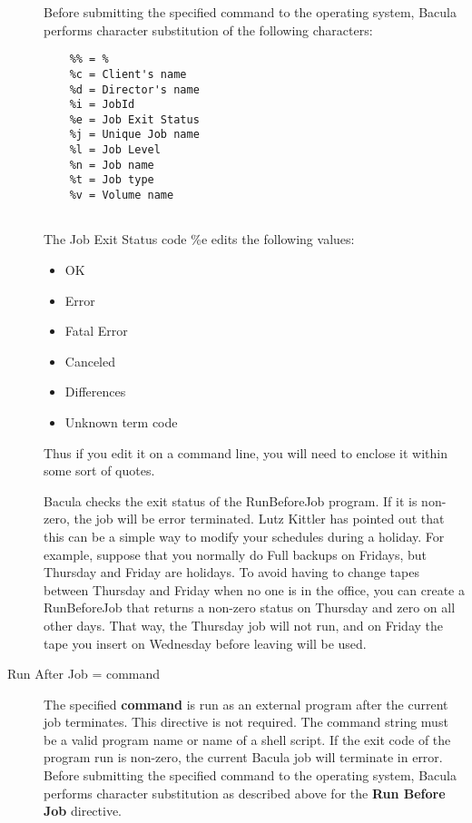 \begin{description}
   Before submitting the specified command to the operating system,  Bacula
   performs character substitution of the following  characters:  
  
\footnotesize
\begin{verbatim}
    %% = %
    %c = Client's name
    %d = Director's name
    %i = JobId
    %e = Job Exit Status
    %j = Unique Job name
    %l = Job Level
    %n = Job name
    %t = Job type
    %v = Volume name
    
\end{verbatim}
\normalsize

The Job Exit Status code \%e edits the following values:

\begin{itemize}
\item OK
\item Error
\item Fatal Error
\item Canceled
\item Differences
\item Unknown term code
\end{itemize}

   Thus if you edit it on a command line, you will need to enclose 
   it within some sort of quotes.
   
   Bacula checks the exit status of the RunBeforeJob 
   program. If it is non-zero, the job will be error terminated.  Lutz Kittler
   has pointed out that this can be a simple way to modify  your schedules during
   a holiday. For example, suppose that you normally  do Full backups on Fridays,
   but Thursday and Friday are holidays. To avoid  having to change tapes between
   Thursday and Friday when no one is in the  office, you can create a
   RunBeforeJob that returns a non-zero status on  Thursday and zero on all other
   days. That way, the Thursday job will not  run, and on Friday the tape you
   insert on Wednesday before leaving will  be used.  

\item [Run After Job = \lt{}command\gt{}]
   The specified {\bf command}  is run as an external program after the current
   job terminates.  This directive is not required. The  command string must be a
   valid program name or name of a shell script.  If the exit code of the program
   run is non-zero, the current  Bacula job will terminate in error.  Before
   submitting the specified command to the operating system,  Bacula performs
   character substitution as described above  for the {\bf Run Before Job}
   directive.  
   

\end{description}
